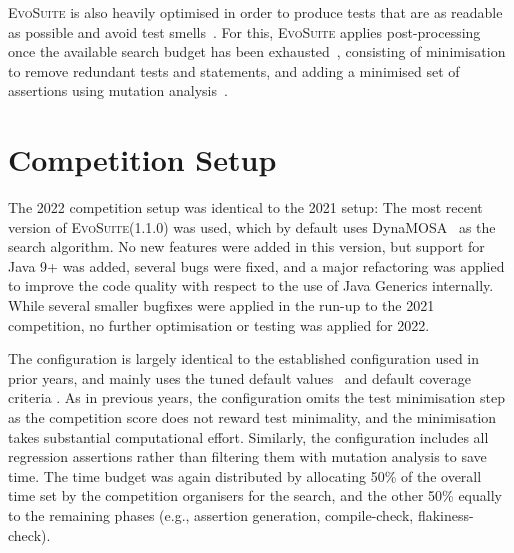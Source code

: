 \documentclass[sigconf]{acmart}
\newcommand{\EVOSUITE}{\textsc{EvoSuite}\xspace}
\begin{document}
\EVOSUITE is also heavily optimised in order to produce tests that are as readable as possible and avoid test smells~\cite{panichella2020revisiting}. For this, \EVOSUITE applies post-processing once the available search budget has been exhausted~\cite{FrA11c,FrA13a}, consisting of minimisation to remove redundant tests and statements, and adding a minimised set of assertions using mutation analysis~\cite{10.1109/TSE.2011.93}. 





\section{Competition Setup}

The 2022 competition setup was identical to the 2021 setup: The most recent
version of \EVOSUITE (1.1.0) was used, which by default uses
DynaMOSA~\cite{dynamosa} as the search algorithm. No new features were added in
this version, but support for Java 9+ was added, several bugs were fixed, and a
major refactoring was applied to improve the code quality with respect to the
use of Java Generics internally. While several smaller bugfixes were applied in
the run-up to the 2021 competition, no further optimisation or testing was
applied for 2022.

The configuration is largely identical to the established configuration used in
prior years, and mainly uses the tuned default
values~\cite{arcuri2013parameter} and default coverage criteria
\cite{rojas2015combining}.
%
As in previous years, the configuration omits the test minimisation step as the
competition score does not reward test minimality, and the minimisation takes
substantial computational effort. Similarly, the configuration includes all
regression assertions rather than filtering them with mutation analysis to save
time.
%
The time budget was again distributed by allocating 50\% of the overall time
set by the competition organisers for the search, and the other 50\% equally to
the remaining phases (e.g., assertion generation, compile-check,
flakiness-check).
\end{document}
